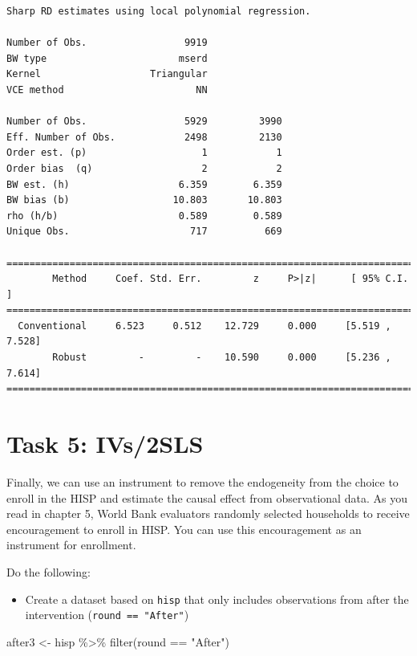 \documentclass[
  letterpaper,
  DIV=11,
  numbers=noendperiod]{scrartcl}
\newenvironment{Shaded}{\begin{snugshade}}{\end{snugshade}}
\newcommand{\FunctionTok}[1]{\textcolor[rgb]{0.28,0.35,0.67}{#1}}
\newcommand{\NormalTok}[1]{\textcolor[rgb]{0.00,0.23,0.31}{#1}}
\newcommand{\OtherTok}[1]{\textcolor[rgb]{0.00,0.23,0.31}{#1}}
\newcommand{\SpecialCharTok}[1]{\textcolor[rgb]{0.37,0.37,0.37}{#1}}
\newcommand{\StringTok}[1]{\textcolor[rgb]{0.13,0.47,0.30}{#1}}
\providecommand{\tightlist}{%
  \setlength{\itemsep}{0pt}\setlength{\parskip}{0pt}}\usepackage{longtable,booktabs,array}
\begin{document}
\begin{verbatim}
Sharp RD estimates using local polynomial regression.

Number of Obs.                 9919
BW type                       mserd
Kernel                   Triangular
VCE method                       NN

Number of Obs.                 5929         3990
Eff. Number of Obs.            2498         2130
Order est. (p)                    1            1
Order bias  (q)                   2            2
BW est. (h)                   6.359        6.359
BW bias (b)                  10.803       10.803
rho (h/b)                     0.589        0.589
Unique Obs.                     717          669

=============================================================================
        Method     Coef. Std. Err.         z     P>|z|      [ 95% C.I. ]       
=============================================================================
  Conventional     6.523     0.512    12.729     0.000     [5.519 , 7.528]     
        Robust         -         -    10.590     0.000     [5.236 , 7.614]     
=============================================================================
\end{verbatim}

\newpage

\hypertarget{task-5-ivs2sls}{%
\section{Task 5: IVs/2SLS}\label{task-5-ivs2sls}}

Finally, we can use an instrument to remove the endogeneity from the
choice to enroll in the HISP and estimate the causal effect from
observational data. As you read in chapter 5, World Bank evaluators
randomly selected households to receive encouragement to enroll in HISP.
You can use this encouragement as an instrument for enrollment.

Do the following:

\begin{itemize}
\tightlist
\item
  Create a dataset based on \texttt{hisp} that only includes
  observations from after the intervention (\texttt{round\ ==\ "After"})
\end{itemize}

\begin{Shaded}
\begin{Highlighting}[numbers=left,,]
\NormalTok{after3 }\OtherTok{\textless{}{-}}\NormalTok{ hisp }\SpecialCharTok{\%\textgreater{}\%} 
  \FunctionTok{filter}\NormalTok{(round }\SpecialCharTok{==} \StringTok{"After"}\NormalTok{)}
\end{Highlighting}
\end{Shaded}
\end{document}
